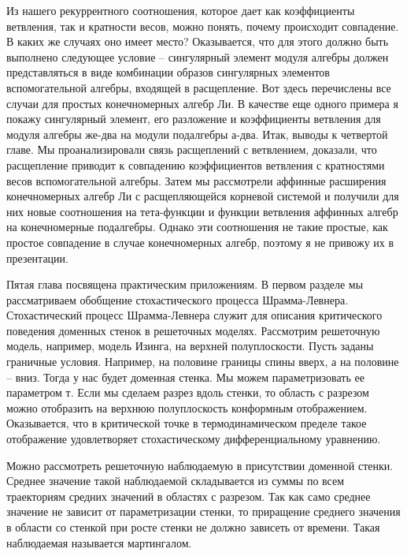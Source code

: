 \documentclass{article}
\theoremstyle{definition} \newtheorem{Def}{Определение}
\begin{document}
Из нашего рекуррентного соотношения, которое дает как коэффициенты ветвления, так и кратности весов, можно понять, почему происходит совпадение.
В каких же случаях оно имеет место?
Оказывается, что для этого должно быть выполнено следующее условие -- сингулярный элемент модуля алгебры должен представляться в виде комбинации образов сингулярных элементов вспомогательной алгебры, входящей в расщепление. Вот здесь перечислены все случаи для простых конечномерных алгебр Ли. 
В качестве еще одного примера я покажу сингулярный элемент, его разложение и коэффициенты ветвления для модуля алгебры же-два на модули подалгебры а-два. 
Итак, выводы к четвертой главе. Мы проанализировали связь расщеплений с ветвлением, доказали, что расщепление приводит к совпадению коэффициентов ветвления с кратностями весов вспомогательной алгебры. Затем мы рассмотрели аффинные расширения конечномерных алгебр Ли с расщепляющейся корневой системой и получили для них новые соотношения на тета-функции и функции ветвления аффинных алгебр на конечномерные подалгебры. Однако эти соотношения не такие простые, как простое совпадение в случае конечномерных алгебр, поэтому я не привожу их в презентации. 

Пятая глава посвящена практическим приложениям. В первом разделе мы рассматриваем обобщение стохастического процесса Шрамма-Левнера. Стохастический процесс Шрамма-Левнера служит для описания критического поведения доменных стенок в решеточных моделях. Рассмотрим решеточную модель, например, модель Изинга, на верхней полуплоскости. Пусть заданы граничные условия. Например, на половине границы спины вверх, а на половине -- вниз. Тогда у нас будет доменная стенка. Мы можем параметризовать ее параметром т. Если мы сделаем разрез вдоль стенки, то область с разрезом можно отобразить на верхнюю полуплоскость конформным отображением. Оказывается, что в критической точке в термодинамическом пределе такое отображение удовлетворяет стохастическому дифференциальному уравнению. 

Можно рассмотреть решеточную наблюдаемую в присутствии доменной стенки. Среднее значение такой наблюдаемой складывается из суммы по всем траекториям средних значений в областях с разрезом. Так как само среднее значение не зависит от параметризации стенки, то приращение среднего значения в области со стенкой при росте стенки не должно зависеть от времени. Такая наблюдаемая называется мартингалом. 
\end{document}
